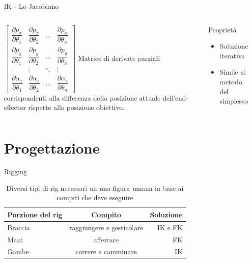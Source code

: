 \documentclass[10pt]{beamer}
\begin{document}
\begin{frame}[fragile]{IK - Lo Jacobiano}
  \begin{columns}[T,onlytextwidth]
    $
    \begin{bmatrix}
        \dfrac{\partial p_x}{\partial \theta_1} & \dfrac{\partial p_x}{\partial \theta_2} & \dots & \dfrac{\partial p_x}{\partial \theta_n} \\[2ex]
        \dfrac{\partial p_y}{\partial \theta_1} & \dfrac{\partial p_y}{\partial \theta_2} & \dots & \dfrac{\partial p_y}{\partial \theta_n} \\[2ex]
        \vdots & \vdots & \ddots & \vdots \\[2ex]
        \dfrac{\partial \alpha_z}{\partial \theta_1} & \dfrac{\partial \alpha_z}{\partial \theta_2} & \dots & \dfrac{\partial \alpha_z}{\partial \theta_n} 
    \end{bmatrix}
    $
		Matrice di derivate parziali corrispondenti alla differenza della posizione attuale dell'end-effector rispetto alla posizione obiettivo.
		\begin{alertblock}{Proprietà}
			\begin{itemize}
				\item Soluzione iterativa
				\item Simile al metodo del simplesso
			\end{itemize}
    \end{alertblock}
	\end{columns}
\end{frame}


\section{Progettazione}
\begin{frame}{Rigging} %
  \begin{table}
					\caption{Diversi tipi di rig necessari un una figura umana in base ai compiti che deve eseguire}
		\begin{tabular}{lcr}
			\toprule
			Porzione del rig & Compito & Soluzione\\
			\midrule
			Braccia & raggiungere e gesticolare & IK e FK\\
			Mani & afferrare & FK\\
			Gambe & correre e camminare & IK\\
			\bottomrule
		\end{tabular}
	\end{table}	
\end{frame}
\end{document}
